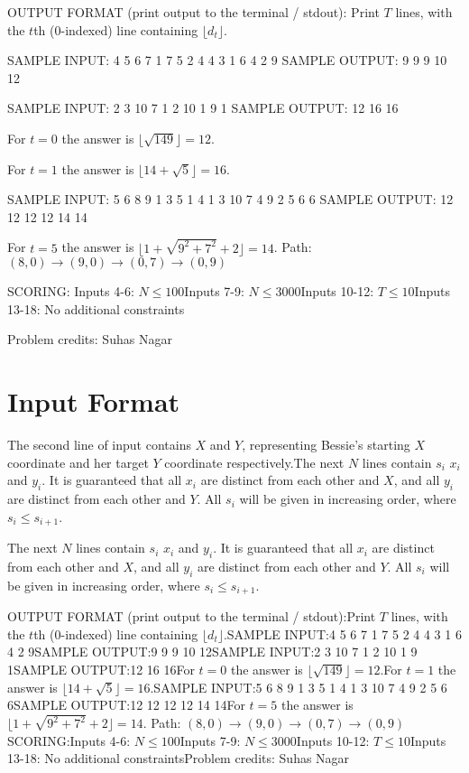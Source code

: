 \documentclass[12pt]{article}
\begin{document}
OUTPUT FORMAT (print output to the terminal / stdout):
Print $T$ lines, with the $t$th (0-indexed) line containing
$\lfloor d_t\rfloor$.

SAMPLE INPUT:
4 5
6 7
1 7 5
2 4 4
3 1 6
4 2 9
SAMPLE OUTPUT: 
9
9
9
10
12

SAMPLE INPUT:
2 3
10 7
1 2 10
1 9 1
SAMPLE OUTPUT: 
12
16
16

For $t=0$ the answer is $\lfloor \sqrt{149} \rfloor=12$.

For $t=1$ the answer is $\lfloor 14+\sqrt 5\rfloor=16$.

SAMPLE INPUT:
5 6
8 9
1 3 5
1 4 1
3 10 7
4 9 2
5 6 6
SAMPLE OUTPUT: 
12
12
12
12
14
14

For $t=5$ the answer is $\lfloor 1+\sqrt{9^2+7^2}+2\rfloor=14$. Path:
$(8,0)\to (9,0)\to (0,7)\to (0,9)$

SCORING:
Inputs 4-6: $N\le 100$Inputs 7-9: $N\le 3000$Inputs 10-12: $T\le 10$Inputs 13-18: No additional constraints


Problem credits: Suhas Nagar



\section*{Input Format}
The second line of input contains $X$ and $Y$, representing Bessie's starting $X$
coordinate and her target $Y$ coordinate respectively.The next $N$ lines contain $s_i$ $x_i$ and $y_i$. It is guaranteed that all
$x_i$ are distinct from each other and $X$, and all $y_i$ are distinct from each
other and $Y$. All $s_i$ will be given in increasing order, where
$s_i \leq s_{i+1}$.

The next $N$ lines contain $s_i$ $x_i$ and $y_i$. It is guaranteed that all
$x_i$ are distinct from each other and $X$, and all $y_i$ are distinct from each
other and $Y$. All $s_i$ will be given in increasing order, where
$s_i \leq s_{i+1}$.

OUTPUT FORMAT (print output to the terminal / stdout):Print $T$ lines, with the $t$th (0-indexed) line containing
$\lfloor d_t\rfloor$.SAMPLE INPUT:4 5
6 7
1 7 5
2 4 4
3 1 6
4 2 9SAMPLE OUTPUT:9
9
9
10
12SAMPLE INPUT:2 3
10 7
1 2 10
1 9 1SAMPLE OUTPUT:12
16
16For $t=0$ the answer is $\lfloor \sqrt{149} \rfloor=12$.For $t=1$ the answer is $\lfloor 14+\sqrt 5\rfloor=16$.SAMPLE INPUT:5 6
8 9
1 3 5
1 4 1
3 10 7
4 9 2
5 6 6SAMPLE OUTPUT:12
12
12
12
14
14For $t=5$ the answer is $\lfloor 1+\sqrt{9^2+7^2}+2\rfloor=14$. Path:
$(8,0)\to (9,0)\to (0,7)\to (0,9)$SCORING:Inputs 4-6: $N\le 100$Inputs 7-9: $N\le 3000$Inputs 10-12: $T\le 10$Inputs 13-18: No additional constraintsProblem credits: Suhas Nagar
\end{document}
